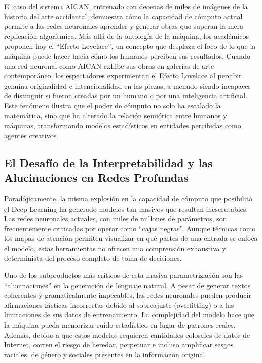 \documentclass[12pt,a4paper]{article}
\begin{document}
El caso del sistema AICAN, entrenado con decenas de miles de imágenes de la historia del arte occidental, demuestra cómo la capacidad de cómputo actual permite a las redes neuronales aprender y generar obras que superan la mera replicación algorítmica\cite{natale2024}. Más allá de la ontología de la máquina, los académicos proponen hoy el ``Efecto Lovelace'', un concepto que desplaza el foco de lo que la máquina puede hacer hacia cómo los humanos perciben sus resultados\cite{natale2024}. Cuando una red neuronal como AICAN exhibe sus obras en galerías de arte contemporáneo, los espectadores experimentan el Efecto Lovelace al percibir genuina originalidad e intencionalidad en las piezas, a menudo siendo incapaces de distinguir si fueron creadas por un humano o por una inteligencia artificial\cite{natale2024}. Este fenómeno ilustra que el poder de cómputo no solo ha escalado la matemática, sino que ha alterado la relación semiótica entre humanos y máquinas, transformando modelos estadísticos en entidades percibidas como agentes creativos\cite{natale2024}.

\subsection{El Desafío de la Interpretabilidad y las Alucinaciones en Redes Profundas}
Paradójicamente, la misma explosión en la capacidad de cómputo que posibilitó el Deep Learning ha generado modelos tan masivos que resultan inescrutables. Las redes neuronales actuales, con miles de millones de parámetros, son frecuentemente criticadas por operar como ``cajas negras''\cite{zhang2023}. Aunque técnicas como los mapas de atención permiten visualizar en qué partes de una entrada se enfoca el modelo, estas herramientas no ofrecen una comprensión exhaustiva y determinista del proceso completo de toma de decisiones\cite{zhang2023}. 

Uno de los subproductos más críticos de esta masiva parametrización son las ``alucinaciones'' en la generación de lenguaje natural\cite{zhang2023}. A pesar de generar textos coherentes y gramaticalmente impecables, las redes neuronales pueden producir afirmaciones fácticas incorrectas debido al sobreajuste (overfitting) o a las limitaciones de sus datos de entrenamiento\cite{zhang2023}. La complejidad del modelo hace que la máquina pueda memorizar ruido estadístico en lugar de patrones reales\cite{zhang2023}. Además, debido a que estos modelos requieren cantidades colosales de datos de Internet, corren el riesgo de heredar, perpetuar e incluso amplificar sesgos raciales, de género y sociales presentes en la información original\cite{zhang2023, haenlein2019}. 
\end{document}
